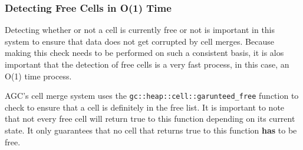 \documentclass[11pt]{article}
\begin{document}
\subsubsection{Detecting Free Cells in O(1) Time}
Detecting whether or not a cell is currently free or not is important in this system to ensure that
data does not get corrupted by cell merges. Because making this check needs to be performed on such a consistent
basis, it is alos important that the detection of free cells is a very fast process, in this case, an O(1) time process.

AGC's cell merge system uses the \texttt{gc::heap::cell::garunteed\_free} function to check to ensure
that a cell is definitely in the free list. It is important to note that not every free cell will return true
to this function depending on its current state. It only guarantees that no cell that returns true to this function
\textbf{has} to be free.
\end{document}
